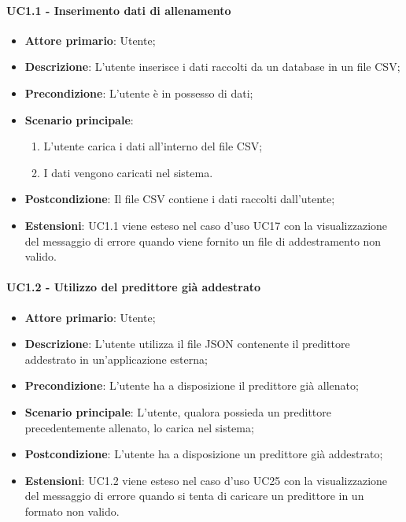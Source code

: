 \paragraph{UC1.1 - Inserimento dati di allenamento}
\label{para:uc1.1}
\begin{itemize}
  \item \textbf{Attore primario}: Utente;
  \item \textbf{Descrizione}: L'utente inserisce i dati raccolti da un database in un file CSV;
  \item \textbf{Precondizione}: L'utente è in possesso di dati;
  \item \textbf{Scenario principale}:
  \begin{enumerate}
    \item L'utente carica i dati all'interno del file CSV;
    \item I dati vengono caricati nel sistema.
  \end{enumerate}
  \item \textbf{Postcondizione}: Il file CSV contiene i dati raccolti dall'utente;
  \item \textbf{Estensioni}: UC1.1 viene esteso nel caso d'uso UC17 con la visualizzazione del messaggio di errore quando viene fornito un file di addestramento non valido.
\end{itemize}

\paragraph{UC1.2 - Utilizzo del predittore già addestrato}
\label{para:uc1.2}
\begin{itemize}
  \item \textbf{Attore primario}: Utente;
  \item \textbf{Descrizione}: L'utente utilizza il file JSON contenente il predittore addestrato in un'applicazione esterna;
  \item \textbf{Precondizione}: L'utente ha a disposizione il predittore già allenato;
  \item \textbf{Scenario principale}: L'utente, qualora possieda un predittore precedentemente allenato, lo carica nel sistema;
  \item \textbf{Postcondizione}: L'utente ha a disposizione un predittore già addestrato;
  \item \textbf{Estensioni}: UC1.2 viene esteso nel caso d'uso UC25 con la visualizzazione del messaggio di errore quando si tenta di caricare un predittore in un formato non valido.
\end{itemize}

